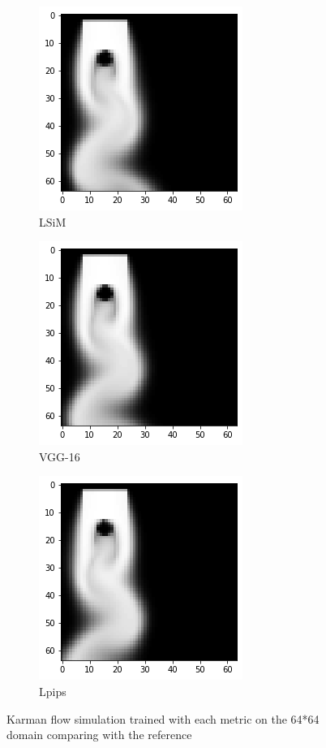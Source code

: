 \documentclass[a4paper,12pt,twoside]{report}
\begin{document}
\begin{figure}
	\begin{subfigure}{0.32\textwidth}
		\centering
		\includegraphics[scale=0.5]{karman_low/lsim}
		\caption{LSiM}
	\end{subfigure}
	\begin{subfigure}{0.32\textwidth}
		\centering
		\includegraphics[scale=0.5]{karman_low/vgg}
		\caption{VGG-16}
	\end{subfigure}
	\begin{subfigure}{0.32\textwidth}
		\centering
		\includegraphics[scale=0.5]{karman_low/lpips}
		\caption{Lpips}
	\end{subfigure}
	\caption{Karman flow simulation trained with each metric on the 64*64 domain comparing with the reference}
	\label{sol karman low}
\end{figure}
\end{document}
